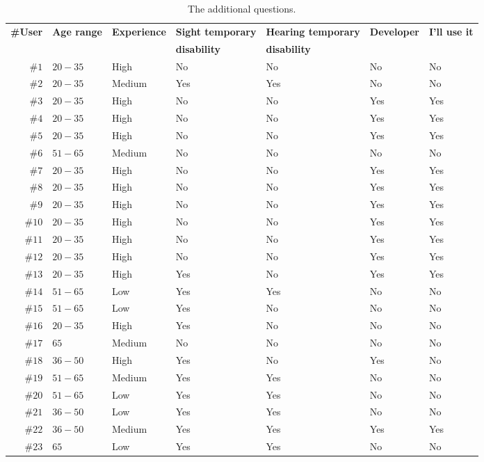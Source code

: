 \begin{table}
  \caption{The additional questions.}
 \label{tbl:additional_questions}
\footnotesize
\centering
 \begin{tabular}{r l l l l l l}
  \hline 
  \textbf{\#User} & \textbf{Age range} & \textbf{Experience} & \textbf{Sight temporary} & \textbf{Hearing temporary} & \textbf{Developer} & \textbf{I'll use it} \\
		  &   & 			   & \textbf{disability}      & \textbf{disability}	\\
  \hline
  $\#1$ & $20-35$ 	     & High		   & No			      & No			   & No			& No	\\
  $\#2$ & $20-35$ 	     & Medium		   & Yes		      & Yes			   & No			& No	\\
  $\#3$ & $20-35$ 	     & High		   & No			      & No			   & Yes		& Yes	\\
  $\#4$ & $20-35$ 	     & High		   & No			      & No			   & Yes		& Yes	\\
  $\#5$ & $20-35$ 	     & High		   & No			      & No			   & Yes		& Yes	\\
  $\#6$ & $51-65$ 	     & Medium		   & No			      & No			   & No			& No	\\
  $\#7$ & $20-35$ 	     & High		   & No			      & No			   & Yes		& Yes	\\
  $\#8$ & $20-35$ 	     & High		   & No			      & No			   & Yes		& Yes	\\
  $\#9$ & $20-35$ 	     & High		   & No			      & No			   & Yes		& Yes	\\
  $\#10$ & $20-35$ 	     & High		   & No			      & No			   & Yes		& Yes	\\
  $\#11$ & $20-35$ 	     & High		   & No			      & No			   & Yes		& Yes	\\
  $\#12$ & $20-35$ 	     & High		   & No			      & No			   & Yes		& Yes	\\
  $\#13$ & $20-35$ 	     & High		   & Yes		      & No			   & Yes		& Yes	\\
  $\#14$ & $51-65$ 	     & Low		   & Yes		      & Yes			   & No			& No	\\
  $\#15$ & $51-65$ 	     & Low		   & Yes		      & No			   & No			& No	\\
  $\#16$ & $20-35$ 	     & High		   & Yes		      & No			   & No			& No	\\
  $\#17$ & $65$ 	     & Medium		   & No			      & No			   & No			& No	\\
  $\#18$ & $36-50$ 	     & High		   & Yes		      & No			   & Yes		& No	\\
  $\#19$ & $51-65$ 	     & Medium		   & Yes		      & Yes			   & No			& No	\\
  $\#20$ & $51-65$ 	     & Low		   & Yes		      & Yes			   & No			& No	\\
  $\#21$ & $36-50$ 	     & Low		   & Yes		      & Yes			   & No			& No	\\
  $\#22$ & $36-50$ 	     & Medium		   & Yes		      & Yes			   & Yes		& Yes	\\
  $\#23$ & $65$	 	     & Low		   & Yes		      & Yes			   & No			& No	\\
  \hline
\end{tabular}
\end{table}


